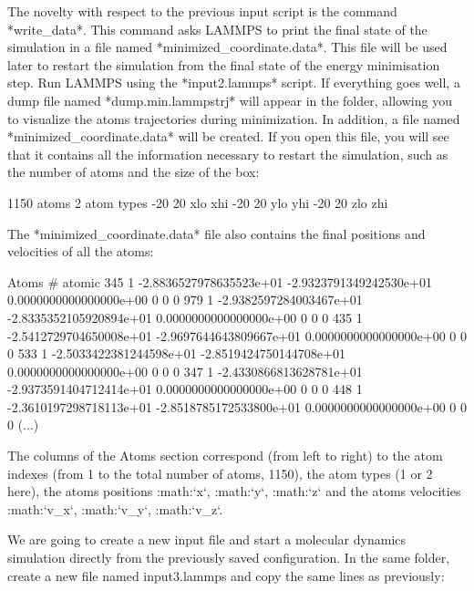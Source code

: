 The novelty with respect to the previous
input script is the command *write_data*. This command
asks LAMMPS to print the final state of the simulation in
a file named *minimized_coordinate.data*. This file will
be used later to restart the simulation from the final
state of the energy minimisation step.
Run LAMMPS using the *input2.lammps* script. If everything
goes well, a dump file named *dump.min.lammpstrj* will
appear in the folder, allowing you to visualize the atoms
trajectories during minimization. In
addition, a file named *minimized_coordinate.data* will be
created. If you open this file, you will see that it
contains all the information necessary to restart the
simulation, such as the number of atoms and the size of
the box:



\begin{lcverbatim}
1150 atoms
2 atom types
-20 20 xlo xhi
-20 20 ylo yhi
-20 20 zlo zhi
\end{lcverbatim}

The *minimized_coordinate.data* file also contains the final
positions and velocities of all the atoms:



\begin{lcverbatim}
Atoms # atomic
345 1 -2.8836527978635523e+01 -2.9323791349242530e+01 0.0000000000000000e+00 0 0 0
979 1 -2.9382597284003467e+01 -2.8335352105920894e+01 0.0000000000000000e+00 0 0 0
435 1 -2.5412729704650008e+01 -2.9697644643809667e+01 0.0000000000000000e+00 0 0 0
533 1 -2.5033422381244598e+01 -2.8519424750144708e+01 0.0000000000000000e+00 0 0 0
347 1 -2.4330866813628781e+01 -2.9373591404712414e+01 0.0000000000000000e+00 0 0 0
448 1 -2.3610197298718113e+01 -2.8518785172533800e+01 0.0000000000000000e+00 0 0 0
(...)
\end{lcverbatim}

The columns of the Atoms section
correspond (from left to right) to the atom indexes (from 1
to the total number of atoms, 1150), the atom types (1 or 2
here), the atoms positions :math:`x`, :math:`y`, :math:`z` and the
atoms velocities :math:`v_x`, :math:`v_y`, :math:`v_z`.






We are going to create a new input file and start a
molecular dynamics simulation directly from the previously
saved configuration. In the same folder, create a new file
named input3.lammps and copy the same lines as previously:



